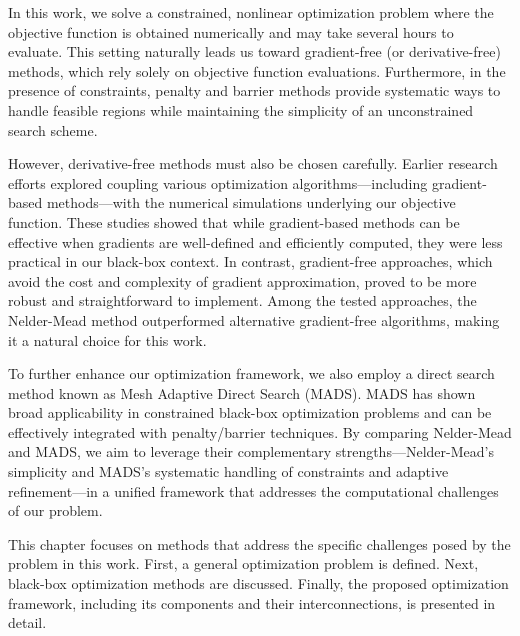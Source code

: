In this work, we solve a constrained, nonlinear optimization problem where the objective function is obtained numerically and may take several hours to evaluate. This setting naturally leads us toward gradient-free (or derivative-free) methods, which rely solely on objective function evaluations. Furthermore, in the presence of constraints, penalty and barrier methods provide systematic ways to handle feasible regions while maintaining the simplicity of an unconstrained search scheme.

However, derivative-free methods must also be chosen carefully. Earlier research efforts \cite{buresBP, buresVU} explored coupling various optimization algorithms—including gradient-based methods—with the numerical simulations underlying our objective function. These studies showed that while gradient-based methods can be effective when gradients are well-defined and efficiently computed, they were less practical in our black-box context. In contrast, gradient-free approaches, which avoid the cost and complexity of gradient approximation, proved to be more robust and straightforward to implement. Among the tested approaches, the Nelder-Mead method outperformed alternative gradient-free algorithms, making it a natural choice for this work.

To further enhance our optimization framework, we also employ a direct search method known as Mesh Adaptive Direct Search (MADS). MADS has shown broad applicability in constrained black-box optimization problems and can be effectively integrated with penalty/barrier techniques. By comparing Nelder-Mead and MADS, we aim to leverage their complementary strengths—Nelder-Mead’s simplicity and MADS’s systematic handling of constraints and adaptive refinement—in a unified framework that addresses the computational challenges of our problem.

This chapter focuses on methods that address the specific challenges posed by the problem in this work. First, a general optimization problem is defined. Next, black-box optimization methods are discussed. Finally, the proposed optimization framework, including its components and their interconnections, is presented in detail.



